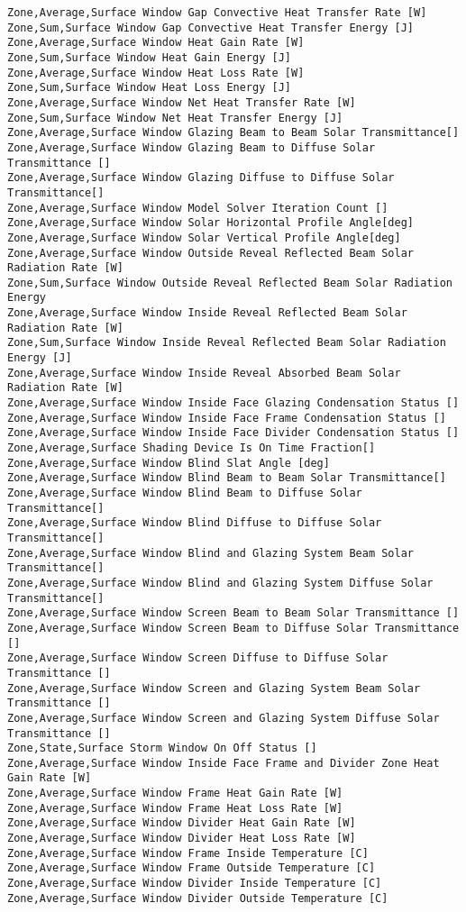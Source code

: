 \begin{lstlisting}
Zone,Average,Surface Window Gap Convective Heat Transfer Rate [W]
Zone,Sum,Surface Window Gap Convective Heat Transfer Energy [J]
Zone,Average,Surface Window Heat Gain Rate [W]
Zone,Sum,Surface Window Heat Gain Energy [J]
Zone,Average,Surface Window Heat Loss Rate [W]
Zone,Sum,Surface Window Heat Loss Energy [J]
Zone,Average,Surface Window Net Heat Transfer Rate [W]
Zone,Sum,Surface Window Net Heat Transfer Energy [J]
Zone,Average,Surface Window Glazing Beam to Beam Solar Transmittance[]
Zone,Average,Surface Window Glazing Beam to Diffuse Solar Transmittance []
Zone,Average,Surface Window Glazing Diffuse to Diffuse Solar Transmittance[]
Zone,Average,Surface Window Model Solver Iteration Count []
Zone,Average,Surface Window Solar Horizontal Profile Angle[deg]
Zone,Average,Surface Window Solar Vertical Profile Angle[deg]
Zone,Average,Surface Window Outside Reveal Reflected Beam Solar Radiation Rate [W]
Zone,Sum,Surface Window Outside Reveal Reflected Beam Solar Radiation Energy
Zone,Average,Surface Window Inside Reveal Reflected Beam Solar Radiation Rate [W]
Zone,Sum,Surface Window Inside Reveal Reflected Beam Solar Radiation Energy [J]
Zone,Average,Surface Window Inside Reveal Absorbed Beam Solar Radiation Rate [W]
Zone,Average,Surface Window Inside Face Glazing Condensation Status []
Zone,Average,Surface Window Inside Face Frame Condensation Status []
Zone,Average,Surface Window Inside Face Divider Condensation Status []
Zone,Average,Surface Shading Device Is On Time Fraction[]
Zone,Average,Surface Window Blind Slat Angle [deg]
Zone,Average,Surface Window Blind Beam to Beam Solar Transmittance[]
Zone,Average,Surface Window Blind Beam to Diffuse Solar Transmittance[]
Zone,Average,Surface Window Blind Diffuse to Diffuse Solar Transmittance[]
Zone,Average,Surface Window Blind and Glazing System Beam Solar Transmittance[]
Zone,Average,Surface Window Blind and Glazing System Diffuse Solar Transmittance[]
Zone,Average,Surface Window Screen Beam to Beam Solar Transmittance []
Zone,Average,Surface Window Screen Beam to Diffuse Solar Transmittance []
Zone,Average,Surface Window Screen Diffuse to Diffuse Solar Transmittance []
Zone,Average,Surface Window Screen and Glazing System Beam Solar Transmittance []
Zone,Average,Surface Window Screen and Glazing System Diffuse Solar Transmittance []
Zone,State,Surface Storm Window On Off Status []
Zone,Average,Surface Window Inside Face Frame and Divider Zone Heat Gain Rate [W]
Zone,Average,Surface Window Frame Heat Gain Rate [W]
Zone,Average,Surface Window Frame Heat Loss Rate [W]
Zone,Average,Surface Window Divider Heat Gain Rate [W]
Zone,Average,Surface Window Divider Heat Loss Rate [W]
Zone,Average,Surface Window Frame Inside Temperature [C]
Zone,Average,Surface Window Frame Outside Temperature [C]
Zone,Average,Surface Window Divider Inside Temperature [C]
Zone,Average,Surface Window Divider Outside Temperature [C]
\end{lstlisting}

